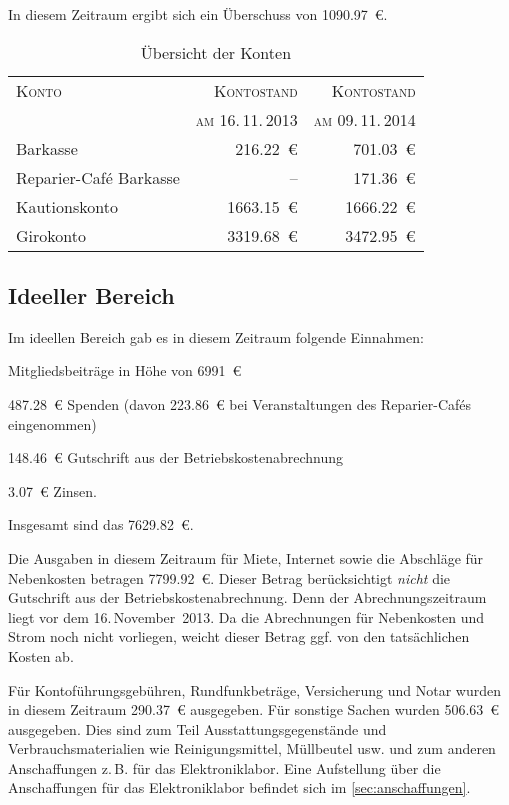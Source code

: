\documentclass[ngerman]{scrartcl}
\begin{document}
In diesem Zeitraum ergibt sich ein Überschuss von \num{1090,97}~\euro{}.

\begin{table}[h!]
  \centering{}
	\begin{tabular}{l|r|r}
          \toprule
	\textsc{Konto} & \textsc{Kontostand} & \textsc{Kontostand}\\
                        & \textsc{am 16.\,11.\,2013} &  \textsc{am 09.\,11.\,2014} \\
          \midrule
	Barkasse & \num{216,22}~\euro{} & \num{701,03}~\euro{} \\
	Reparier-Café Barkasse & -- & \num{171,36}~\euro{} \\
	Kautionskonto & \num{1663,15}~\euro{} & \num{1666,22}~\euro{} \\
	Girokonto & \num{3319,68}~\euro{} & \num{3472,95}~\euro{}\\ \bottomrule
	\end{tabular}
\caption{Übersicht der Konten}
\end{table}

\subsection{Ideeller Bereich}
\label{sec:ideeller_bereich}

Im ideellen Bereich gab es in diesem Zeitraum folgende Einnahmen:
\begin{compactitem}
\item Mitgliedsbeiträge in Höhe von \num{6991}~\euro{}
\item \num{487,28}~\euro{} Spenden (davon \num{223,86}~\euro{} bei Veranstaltungen des Reparier-Cafés eingenommen)
\item \num{148,46}~\euro{} Gutschrift aus der Betriebskostenabrechnung 
\item \num{3,07}~\euro{} Zinsen.
\end{compactitem}
Insgesamt sind das \num{7629,82}~\euro{}.

Die Ausgaben in diesem Zeitraum für Miete, Internet sowie die Abschläge für Nebenkosten betragen \num{7799,92}~\euro{}.
Dieser Betrag berücksichtigt \emph{nicht} die Gutschrift aus der Betriebskostenabrechnung. Denn der Abrechnungszeitraum liegt vor dem 16.\,November~2013.
Da die Abrechnungen für Nebenkosten und Strom noch nicht vorliegen, weicht dieser Betrag ggf. von den tatsächlichen Kosten ab.

Für Kontoführungsgebühren, Rundfunkbeträge, Versicherung und Notar wurden in diesem Zeitraum \num{290,37}~\euro{} ausgegeben.
Für sonstige Sachen wurden \num{506,63}~\euro{} ausgegeben. Dies sind zum Teil Ausstattungsgegenstände und Verbrauchsmaterialien wie Reinigungsmittel, Müllbeutel usw. und zum anderen Anschaffungen z.\,B. für das Elektroniklabor. Eine Aufstellung über die Anschaffungen für das Elektroniklabor befindet sich im \autoref{sec:anschaffungen}.
\end{document}
